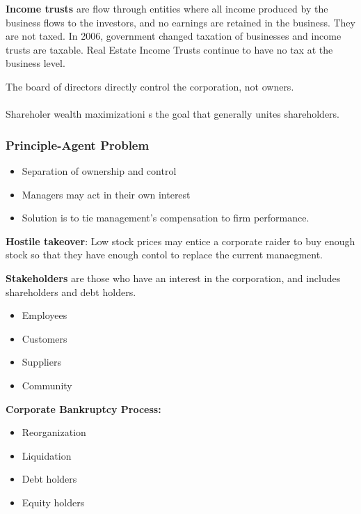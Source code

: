 \documentclass[english, 12pt]{article}
\begin{document}
\begin{defn}
\textbf{Income trusts} are flow through entities where all income produced by the business flows to the investors, and no earnings are retained in the business. They are not taxed. In 2006, government changed taxation of businesses and income trusts are taxable. Real Estate Income Trusts continue to have no tax at the business level.
\end{defn}
The board of directors directly control the corporation, not owners.\\\\
Shareholer wealth maximizationi s the goal that generally unites shareholders.
\subsubsection*{Principle-Agent Problem}
\begin{itemize}
\item Separation of ownership and control
\item Managers may act in their own interest
\item Solution is to tie management's compensation to firm performance.
\end{itemize}
\begin{defn}
\textbf{Hostile takeover}: Low stock prices may entice a corporate raider to buy enough stock so that they have enough contol to replace the current manaegment.
\end{defn}
\begin{defn}
\textbf{Stakeholders} are those who have an interest in the corporation, and includes shareholders and debt holders.
\begin{itemize}
\item Employees
\item Customers
\item Suppliers
\item Community
\end{itemize}
\end{defn}
\begin{defn}
\textbf{Corporate Bankruptcy Process:}
\begin{itemize}
\item Reorganization
\item Liquidation
\item Debt holders
\item Equity holders
\end{itemize}
\end{defn}
\end{document}
